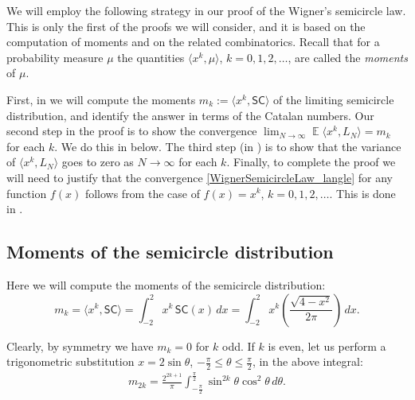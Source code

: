 \documentclass[letterpaper,11pt,oneside,reqno]{amsart}
\numberwithin{equation}{section}
\newcommand{\SC}{\mathsf{SC}}
\DeclareMathOperator{\EE}{\mathbb{E}}
\theoremstyle{definition}
\begin{document}
We will employ the following strategy in our proof of the Wigner's semicircle
law. This is only the first of the proofs we will consider, and it is based on
the computation of moments and on the related combinatorics. Recall that for a
probability measure $\mu$ the quantities $\langle x^{k},\mu\rangle$,
$k=0,1,2,\ldots$, are called the \emph{moments} of $\mu$.

First, in 
we will compute the moments  $m_k:=\langle x^k, \SC\rangle$ of the
limiting semicircle distribution, and identify the answer in terms of the
Catalan numbers. Our second step in the proof is to show the convergence
$\lim_{N\to\infty}\EE \langle x^k,L_N\rangle = m_k$ for each $k$. We do this in 
below.
The third
step (in ) 
is to show that  the variance of $\langle x^k,L_N\rangle$ goes to zero as
$N\to\infty$ for each $k$. Finally, to complete the proof we will need to
justify that  the convergence \eqref{WignerSemicircleLaw_langle} for any
function $f(x)$ follows from the case of $f(x)=x^{k}$, $k=0,1,2,\ldots$.
This is done in .


\subsection{Moments of the semicircle distribution} %
\label{sub:moments_of_the_semicircle_distribution}

Here we will compute the moments of the semicircle distribution:
\begin{equation*}
m_k=\langle x^k, \SC\rangle
=\int_{-2}^2 x^k\, \SC(x)\,dx
=\int_{-2}^2 x^k \left( \frac{\sqrt{4-x^2}}{2\pi}\right)\,dx.
\end{equation*}

Clearly, by symmetry we have $m_k=0$ for $k$ odd. If $k$ is even, let us perform a trigonometric substitution
$x=2\sin \theta$, $-\frac\pi2\le \theta\le \frac\pi2$, in the above integral:
\begin{align}\label{SC_moments_m_2k}
	m_{2k}=\frac{2^{2k+1}}{\pi}\int_{-\frac\pi2}^{\frac\pi2}\sin^{2k}\theta\cos^{2}\theta \,d\theta.
\end{align}
\end{document}
